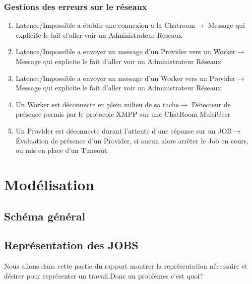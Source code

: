 \documentclass[11pt]{report}
\begin{document}
\subsection{Gestions des erreurs sur le réseaux}
\begin{enumerate}
\item Latence/Impossible a établir une  connexion a la Chatroom$ \rightarrow $ Message qui explicite le fait d'aller voir un Administrateur Reseaux
\item Latence/Impossible a envoyer un  message d'un Provider vers un Worker$ \rightarrow $ Message qui explicite le fait d'aller voir un Administrateur Réseaux
\item Latence/Impossible a envoyer un  message d'un Worker vers un Provider$ \rightarrow $ Message qui explicite le fait d'aller voir un Administrateur Réseaux 
\item Un Worker est déconnecte en plein milieu de sa tache$ \rightarrow $ Détecteur de présence permis par le protocole XMPP sur une ChatRoom MultiUser
\item Un Provider est déconnecte durant l'attente d'une réponse sur un JOB$ \rightarrow $ Évaluation de présence d'un Provider, si aucun alors arrêter le Job en cours, ou mis en place d'un Timeout.
\end{enumerate}

\newpage
\chapter{Modélisation}
\section{Schéma général} 





\newpage
\section{Représentation des JOBS}
Nous allons dans cette partie du rapport montrer la représentation nécessaire et désirer pour représenter un travail.Donc un problèmes c'est quoi? 
\end{document}
